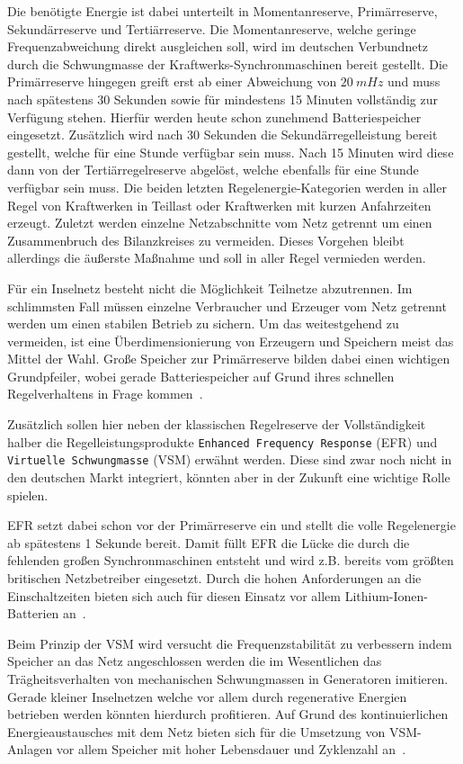 Die benötigte Energie ist dabei unterteilt in Momentanreserve, Primärreserve, Sekundärreserve 
und Tertiärreserve.
Die Momentanreserve, welche geringe Frequenzabweichung direkt ausgleichen soll, wird im deutschen Verbundnetz
durch die Schwungmasse der Kraftwerks-Synchronmaschinen bereit gestellt.
Die Primärreserve hingegen greift erst ab einer Abweichung von $20\ mHz$ und muss nach spätestens 30 Sekunden
sowie für mindestens 15 Minuten vollständig zur Verfügung stehen.
Hierfür werden heute schon zunehmend Batteriespeicher eingesetzt.
Zusätzlich wird nach 30 Sekunden die Sekundärregelleistung bereit gestellt, welche für eine Stunde verfügbar sein muss.
Nach 15 Minuten wird diese dann von der Tertiärregelreserve abgelöst, welche ebenfalls für eine Stunde verfügbar sein muss.
Die beiden letzten Regelenergie-Kategorien werden in aller Regel von Kraftwerken in Teillast oder Kraftwerken mit kurzen Anfahrzeiten
erzeugt.
Zuletzt werden einzelne Netzabschnitte vom Netz getrennt um einen Zusammenbruch des Bilanzkreises zu vermeiden.
Dieses Vorgehen bleibt allerdings die äußerste Maßnahme und soll in aller Regel vermieden werden.

Für ein Inselnetz besteht nicht die Möglichkeit Teilnetze abzutrennen. 
Im schlimmsten Fall müssen einzelne Verbraucher und Erzeuger vom Netz getrennt werden um einen stabilen Betrieb zu sichern.
Um das weitestgehend zu vermeiden, ist eine Überdimensionierung von Erzeugern und Speichern meist das Mittel der Wahl.
Große Speicher zur Primärreserve bilden dabei einen wichtigen Grundpfeiler, wobei gerade Batteriespeicher 
auf Grund ihres schnellen Regelverhaltens in Frage kommen~\parencite{Itschner}.

Zusätzlich sollen hier neben der klassischen Regelreserve der Vollständigkeit halber die Regelleistungsprodukte \texttt{Enhanced Frequency Response}
(EFR) und \texttt{Virtuelle Schwungmasse} (VSM) erwähnt werden.
Diese sind zwar noch nicht in den deutschen Markt integriert, könnten aber in der Zukunft eine wichtige Rolle spielen.

EFR setzt dabei schon vor der Primärreserve ein und stellt die volle Regelenergie ab spätestens 1 Sekunde bereit.
Damit füllt EFR die Lücke die durch die fehlenden großen Synchronmaschinen entsteht und wird z.B. bereits vom 
größten britischen Netzbetreiber eingesetzt.
Durch die hohen Anforderungen an die Einschaltzeiten bieten sich auch für diesen Einsatz vor allem
Lithium-Ionen-Batterien an~\parencite{mantar_gundogdu_battery_2018}.

Beim Prinzip der VSM wird versucht die Frequenzstabilität zu verbessern indem Speicher an das Netz angeschlossen werden
die im Wesentlichen das Trägheitsverhalten von mechanischen Schwungmassen in Generatoren imitieren.
Gerade kleiner Inselnetzen welche vor allem durch regenerative Energien betrieben werden könnten hierdurch profitieren.
Auf Grund des kontinuierlichen Energieaustausches mit dem Netz bieten sich für die Umsetzung von VSM-Anlagen vor allem
Speicher mit hoher Lebensdauer und Zyklenzahl an~\parencite{boxleitner_virtuelle_2009}.

